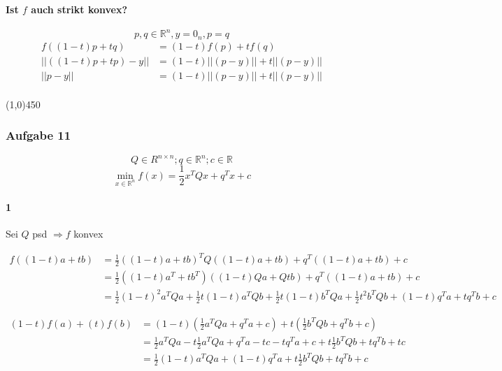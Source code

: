 \documentclass{article}
\newcommand{\hr}{\begin{center} \line(1,0){450} \end{center}}
\begin{document}
\paragraph{Ist $f$ auch strikt konvex?}
$$p,q \in \mathbb{R}^n,y=0_n,p=q$$
\begin{equation}
\begin{split}
	f((1-t)p+tq) &= (1-t)f(p) + tf(q)\\
	\vert\vert((1-t)p+tp) -y\vert\vert &= (1-t) \vert\vert  (p -y)  \vert\vert+ t \vert\vert (p-y)\vert\vert\\
	\vert\vert p-y\vert\vert &= (1-t) \vert\vert  (p -y)  \vert\vert+ t \vert\vert (p-y)\vert\vert\\
	\end{split}
\end{equation}

\hr
\subsubsection*{Aufgabe 11}
$$Q  \in R^{n\times n};q \in \mathbb{R}^n; c \in \mathbb{R}$$
$$\min\limits_{x \in \mathbb{R}^n} f(x) = \frac{1}{2} x^TQx+q^Tx+c$$

\paragraph{1} Sei $Q$ psd $\Rightarrow f$ konvex


\begin{equation}
\begin{split}
f((1-t)a+tb) &= \frac{1}{2}((1-t)a+tb)^T Q ((1-t)a+tb)+ q^T((1-t)a+tb) + c \\
&= \frac{1}{2}((1-t)a^T + tb^T) ((1-t)Qa + Qtb) + q^T((1-t)a+tb) + c\\
&= \frac{1}{2}(1-t)^2 a^TQa + \frac{1}{2}t(1-t)a^TQb + \frac{1}{2}t(1-t)b^TQa + \frac{1}{2}t^2b^TQb + (1-t)q^Ta+t q^Tb +c%
\end{split}
\end{equation}


\begin{equation}
\begin{split}
(1-t)f(a) + (t)f(b) &= (1-t)(\frac{1}{2} a^TQa+q^Ta+c) 									+ t(\frac{1}{2} b^TQb+q^Tb+c)\\
					&= \frac{1}{2} a^TQa-t\frac{1}{2} a^TQa+q^Ta-tc -tq^Ta+c + t\frac{1}{2} b^TQb+tq^Tb+tc\\
&=\frac{1}{2}(1-t)a^TQa +(1-t)q^Ta + t\frac{1}{2} b^TQb+tq^Tb +c
\end{split}
\end{equation}
\end{document}
